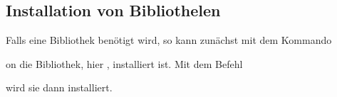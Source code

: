 \subsection{Installation von Bibliothelen}

Falls eine Bibliothek benötigt wird, so kann zunächst mit dem Kommando 

\medskip


\medskip

on die Bibliothek, hier , installiert ist. Mit dem Befehl

\medskip


\medskip

wird sie dann installiert.